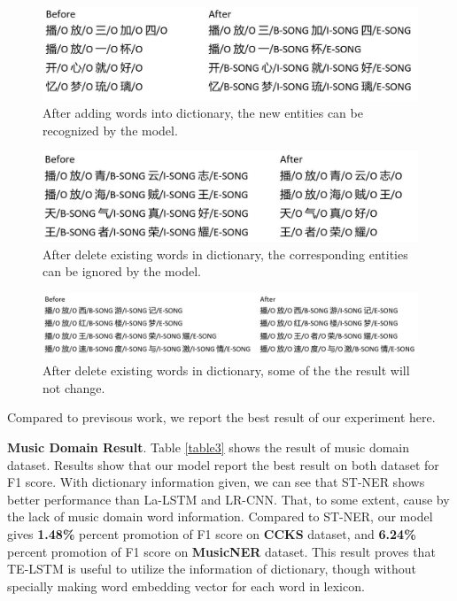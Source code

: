 \documentclass[letterpaper]{article} %
\begin{document}
\begin{figure}[t]
\centering
\includegraphics[width=0.8\columnwidth]{change_after_adding_song} %
\caption{After adding words into dictionary, the new entities can be recognized by the model.}
\label{fig3}
\end{figure}

\begin{figure}[t]
\centering
\includegraphics[width=0.8\columnwidth]{change_after_delete_song} %
\caption{After delete existing words in dictionary, the corresponding entities can be ignored by the model.}
\label{fig4}
\end{figure}

\begin{figure}[t]
\centering
\includegraphics[width=1.0\columnwidth]{no_change_after_delete_song} %
\caption{After delete existing words in dictionary, some of the the result will not change.}
\label{fig5}
\end{figure}

Compared to previsous work, we report the best result of our experiment here.

\textbf{Music Domain Result}. Table \ref{table3} shows the result of music domain dataset. Results show that our model report the best result on both dataset for F1 score. With dictionary information given, we can see that ST-NER shows better performance than La-LSTM and LR-CNN. That, to some extent, cause by the lack of music domain word information. Compared to ST-NER, our model gives \textbf{1.48\%} percent promotion of F1 score on \textbf{CCKS} dataset, and \textbf{6.24\%} percent promotion of F1 score on \textbf{MusicNER} dataset. This result proves that TE-LSTM is useful to utilize the information of dictionary, though without specially making word embedding vector for each word in lexicon.
\end{document}
